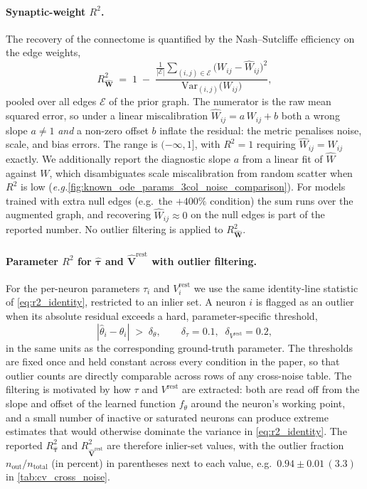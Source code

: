 \documentclass{article}
\def\eg{{\it e.g.}}
\def\vrest{V^{\mathrm{rest}}}
\begin{document}
\paragraph{Synaptic-weight $R^2$.}
The recovery of the connectome is quantified by the
Nash--Sutcliffe efficiency on the edge weights,
\begin{equation}
    R^2_{\hat{\mathbf{W}}}
        \;=\; 1 \;-\;
        \frac{\frac{1}{|\mathcal{E}|}\sum_{(i,j)\in\mathcal{E}}
              \big(W_{ij} - \hat{W}_{ij}\big)^2}
             {\mathrm{Var}_{(i,j)}\!\big(W_{ij}\big)},
    \label{eq:r2_identity}
\end{equation}
pooled over all edges $\mathcal{E}$ of the prior graph. The numerator
is the raw mean squared error, so under a linear miscalibration
$\hat{W}_{ij} = a\,W_{ij} + b$ both a wrong slope $a \neq 1$
\emph{and} a non-zero offset $b$ inflate the residual: the metric
penalises noise, scale, and bias errors. The range is
$(-\infty, 1]$, with $R^2 = 1$ requiring $\hat{W}_{ij} = W_{ij}$
exactly. We additionally report the diagnostic slope $a$ from a
linear fit of $\hat{W}$ against $W$, which disambiguates scale
miscalibration from random scatter when $R^2$ is low (\eg \cref{fig:known_ode_params_3col_noise_comparison}). For models
trained with extra null edges (e.g.\ the $+400\%$ condition) the sum
runs over the augmented graph, and recovering
$\hat{W}_{ij} \approx 0$ on the null edges is part of the
reported number. No outlier filtering is applied to
$R^2_{\hat{\mathbf{W}}}$.

\paragraph{Parameter $R^2$ for $\hat{\boldsymbol{\tau}}$ and
$\hat{\mathbf{V}}^{\mathrm{rest}}$ with outlier filtering.}
For the per-neuron parameters $\tau_i$ and $\vrest_i$ we use the same
identity-line statistic of \cref{eq:r2_identity}, restricted to an
inlier set. A neuron $i$ is flagged as an outlier when its absolute
residual exceeds a hard, parameter-specific threshold,
\begin{equation}
    |\hat\theta_i - \theta_i| \;>\; \delta_\theta,
    \qquad
    \delta_\tau = 0.1,\;\;
    \delta_{\vrest} = 0.2,
    \label{eq:outlier_threshold}
\end{equation}
in the same units as the corresponding ground-truth parameter. The
thresholds are fixed once and held constant across every condition in
the paper, so that outlier counts are directly comparable across rows
of any cross-noise table. The filtering is motivated by
how $\tau$ and $\vrest$ are extracted: both are read off from the
slope and offset of the learned function
$f_\theta$ around the neuron's working point, and a small number of
inactive or saturated neurons can produce extreme estimates that
would otherwise dominate the variance in
\cref{eq:r2_identity}. The reported $R^2_{\hat{\boldsymbol{\tau}}}$
and $R^2_{\hat{\mathbf{V}}^{\mathrm{rest}}}$ are therefore
inlier-set values, with the outlier fraction
$n_{\text{out}}/n_{\text{total}}$ (in percent) in parentheses next to
each value, e.g.\ $0.94 \pm 0.01\,(3.3)$ in
\cref{tab:cv_cross_noise}.
\end{document}
